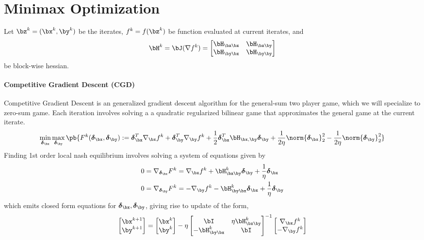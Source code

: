 \documentclass[../summary.tex]{subfiles}
\begin{document}
\newcommand\bdelta{\ensuremath{\boldsymbol{\delta}}}

\section{Minimax Optimization}

Let $\bz^k = (\bx^k, \by^k)$ be the iterates, $f^k = f(\bz^k)$ be function evaluated at current iterates, and 
\[
    \bH^k 
        = \bJ(\nabla f^k)
        = 
    \begin{bmatrix}
        \bH_{\bx\bx} & \bH_{\bx\by} \\
        \bH_{\by\bx} & \bH_{\by\by} \\
    \end{bmatrix}    
\]
be block-wise hessian.

\paragraph{Competitive Gradient Descent (CGD)} Competitive Gradient Descent \cite{schaferCompetitiveGradientDescent2019} is an generalized gradient descent algorithm for the general-sum two player game, which we will specialize to zero-sum game. Each iteration involves solving a a quadratic regularized bilinear game that approximates the general game at the current iterate. 
\begin{align*}
    \min_{\bdelta_{\bx}} \max_{\bdelta_{\by}} \pb{
        F^k(\bdelta_{\bx},\bdelta_{\by})
        := \bdelta_{\bx}^T \nabla_{\bx} f^k + \bdelta_{\by}^T \nabla_{\by} f^k + \frac{1}{2} \bdelta_{\bx}^T \bH_{\bx,\by} \bdelta_{\by} + \frac{1}{2\eta}\norm{\bdelta_{\bx}}_2^2 - \frac{1}{2\eta}\norm{\bdelta_{\by}}_2^2
    } 
\end{align*}
Finding 1st order local nash equilibrium involves solving a system of equations given by
\begin{align*}
    0 = \nabla_{\bdelta_{\bx}} F^k
        &= \nabla_{\bx} f^k + \bH_{\bx\by}^k \bdelta_{\by} + \frac{1}{\eta} \bdelta_{\bx} \\
    0 = \nabla_{\bdelta_{\by}} F^k
        &= - \nabla_{\by} f^k - \bH_{\by\bx}^k \bdelta_{\bx} + \frac{1}{\eta} \bdelta_{\by} 
\end{align*}
which emits closed form equations for $\bdelta_{\bx},\bdelta_{\by}$, giving rise to update of the form,
\begin{align*}
    \begin{bmatrix}
        \bx^{k+1}\\
        \by^{k+1}
    \end{bmatrix}
    = 
    \begin{bmatrix}
        \bx^{k}\\
        \by^{k}
    \end{bmatrix}
    - 
    \eta 
    \begin{bmatrix}
        \bI & \eta \bH^k_{\bx\by} \\
        -\bH^k_{\by\bx} & \bI
    \end{bmatrix}^{-1}
    \begin{bmatrix}
        \nabla_{\bx} f^k \\
        -\nabla_{\by} f^k
    \end{bmatrix}
\end{align*}
\end{document}
